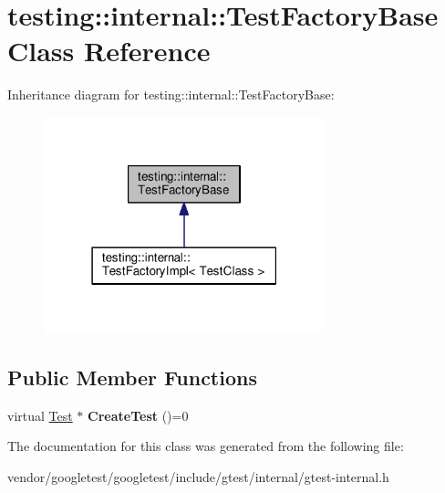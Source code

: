 \hypertarget{classtesting_1_1internal_1_1TestFactoryBase}{}\section{testing\+:\+:internal\+:\+:Test\+Factory\+Base Class Reference}
\label{classtesting_1_1internal_1_1TestFactoryBase}


Inheritance diagram for testing\+:\+:internal\+:\+:Test\+Factory\+Base\+:\nopagebreak
\begin{figure}[H]
\begin{center}
\leavevmode
\includegraphics[width=231pt]{classtesting_1_1internal_1_1TestFactoryBase__inherit__graph}
\end{center}
\end{figure}
\subsection*{Public Member Functions}
\begin{DoxyCompactItemize}
\item 
virtual \hyperlink{classtesting_1_1Test}{Test} $\ast$ {\bfseries Create\+Test} ()=0\hypertarget{classtesting_1_1internal_1_1TestFactoryBase_a07ac3ca0b196cdb092da0bb186b7c030}{}\label{classtesting_1_1internal_1_1TestFactoryBase_a07ac3ca0b196cdb092da0bb186b7c030}

\end{DoxyCompactItemize}


The documentation for this class was generated from the following file\+:\begin{DoxyCompactItemize}
\item 
vendor/googletest/googletest/include/gtest/internal/gtest-\/internal.\+h\end{DoxyCompactItemize}

